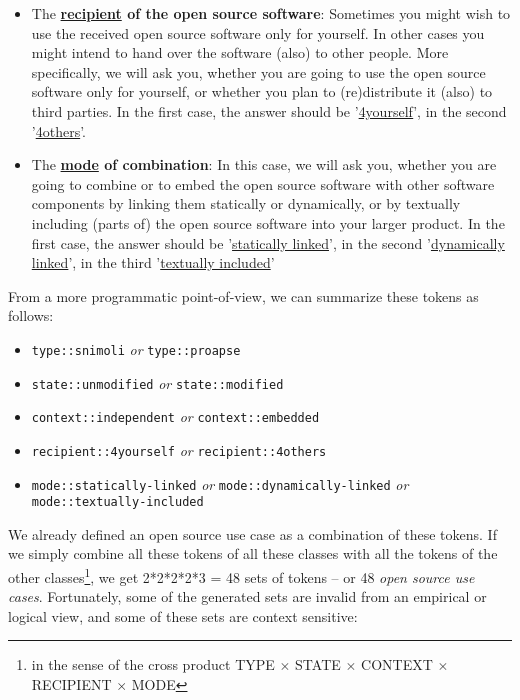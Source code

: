 \begin{itemize}
  \item The \textbf{\underline{recipient} of the open source software}:
  Sometimes you might wish to use the received open source software only for
  yourself. In other cases you might intend to hand over the software (also) to
  other people. More specifically, we will ask you, whether you are going to use
  the open source software only for yourself, or whether you plan to
  (re)distribute it (also) to third parties. In the first case, the answer
  should be '\underline{4yourself}', in the second '\underline{4others}'.
 
  \item The \textbf{\underline{mode} of combination}: In this case, we will ask
  you, whether you are going to combine or to embed the open source software
  with other software components by linking them statically or dynamically, or
  by textually including (parts of) the open source software into your larger
  product. In the first case, the answer should be '\underline{statically
  linked}', in the second '\underline{dynamically linked}', in the third
  '\underline{textually included}'
  
\end{itemize}

From a more programmatic point-of-view, we can summarize these tokens as
follows:

\begin{itemize}
  \item \texttt{type::snimoli} \emph{or} \texttt{type::proapse}
  \item \texttt{state::unmodified} \emph{or} \texttt{state::modified}
  \item \texttt{context::independent} \emph{or} \texttt{context::embedded}
  \item \texttt{recipient::4yourself} \emph{or} \texttt{recipient::4others}
  \item \texttt{mode::statically-linked} \emph{or} \texttt{mode::dynamically-linked}
   \emph{or} \\ \texttt{mode::textually-included}
\end{itemize}

We already defined an open source use case as a combination of these tokens. If
we simply combine all these tokens of all these classes with all the tokens of
the other classes\footnote{in the sense of the cross product TYPE $\times$ STATE
$\times$ CONTEXT $\times$ RECIPIENT $\times$ MODE}, we get 2*2*2*2*3 = 48 sets
of tokens -- or 48 \emph{open source use cases}. Fortunately, some of the
generated sets are invalid from an empirical or logical view, and some of these
sets are context sensitive:
\label{InvalidFinderTokenCombinations}

